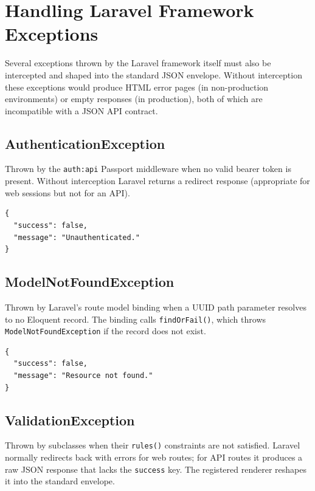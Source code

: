 \section{Handling Laravel Framework Exceptions}
\label{sec:framework-exceptions}

Several exceptions thrown by the Laravel framework itself must also be
intercepted and shaped into the standard JSON envelope. Without
interception these exceptions would produce HTML error pages (in
non-production environments) or empty responses (in production), both
of which are incompatible with a JSON API contract.

\subsection{AuthenticationException}

Thrown by the \texttt{auth:api} Passport middleware when no valid
bearer token is present. Without interception Laravel returns a redirect
response (appropriate for web sessions but not for an API).

\begin{lstlisting}[style=json, caption={Rendered HTTP 401 response.}]
{
  "success": false,
  "message": "Unauthenticated."
}
\end{lstlisting}

\subsection{ModelNotFoundException}

Thrown by Laravel's route model binding when a UUID path parameter
resolves to no Eloquent record. The binding calls
\texttt{findOrFail()}, which throws \texttt{ModelNotFoundException} if
the record does not exist.

\begin{lstlisting}[style=json, caption={Rendered HTTP 404 response.}]
{
  "success": false,
  "message": "Resource not found."
}
\end{lstlisting}

\subsection{ValidationException}

Thrown by  subclasses when their
\texttt{rules()} constraints are not satisfied. Laravel normally
redirects back with errors for web routes; for API routes it produces
a raw JSON response that lacks the \texttt{success} key. The
registered renderer reshapes it into the standard envelope.

